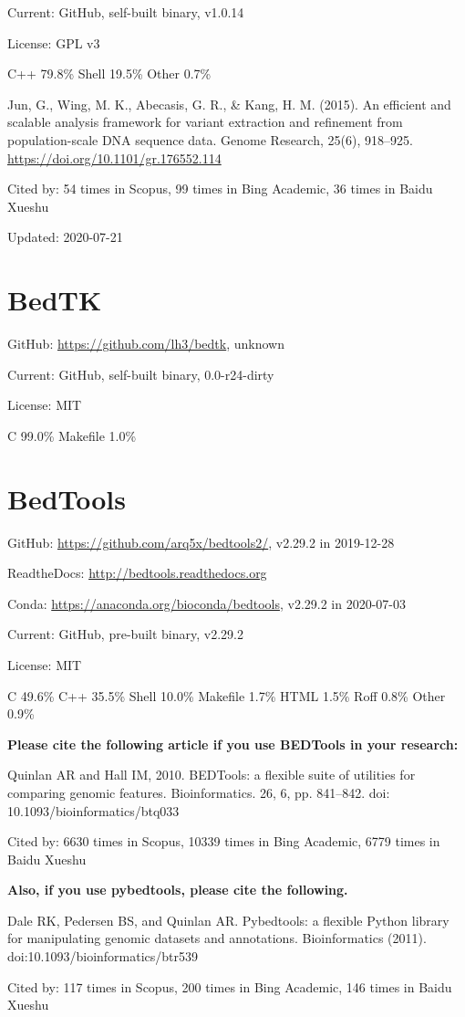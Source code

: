 \documentclass[]{article}
\newcommand{\cb}[3]{\par Cited by: {\color{blue}\Huge #1} times in Scopus, {\color{blue}\Huge #2} times in Bing Academic, {\color{blue}\Huge #3} times in Baidu Xueshu}
\begin{document}
Current: GitHub, self-built binary, v1.0.14

License: GPL v3

C++ 79.8\% Shell 19.5\% Other 0.7\%

Jun, G., Wing, M. K., Abecasis, G. R., \& Kang, H. M. (2015). An efficient and scalable analysis framework for variant extraction and refinement from population-scale DNA sequence data. Genome Research, 25(6), 918–925. \url{https://doi.org/10.1101/gr.176552.114}\cb{54}{99}{36}

Updated: 2020-07-21

\section{BedTK}

GitHub: \url{https://github.com/lh3/bedtk}, unknown

Current: GitHub, self-built binary, 0.0-r24-dirty

License: MIT

C 99.0\% Makefile 1.0\%

\section{BedTools}

GitHub: \url{https://github.com/arq5x/bedtools2/}, v2.29.2 in 2019-12-28

ReadtheDocs: \url{http://bedtools.readthedocs.org}

Conda: \url{https://anaconda.org/bioconda/bedtools}, v2.29.2 in 2020-07-03

Current: GitHub, pre-built binary, v2.29.2

License: MIT

C 49.6\% C++ 35.5\% Shell 10.0\% Makefile 1.7\% HTML 1.5\% Roff 0.8\% Other 0.9\%

\textbf{Please cite the following article if you use BEDTools in your research:}

Quinlan AR and Hall IM, 2010. BEDTools: a flexible suite of utilities for comparing genomic features. Bioinformatics. 26, 6, pp. 841–842.  doi: 10.1093/bioinformatics/btq033 \cb{6630}{10339}{6779}

\textbf{Also, if you use pybedtools, please cite the following.}

Dale RK, Pedersen BS, and Quinlan AR. Pybedtools: a flexible Python library for manipulating genomic datasets and annotations. Bioinformatics (2011). doi:10.1093/bioinformatics/btr539\cb{117}{200}{146}
\end{document}
